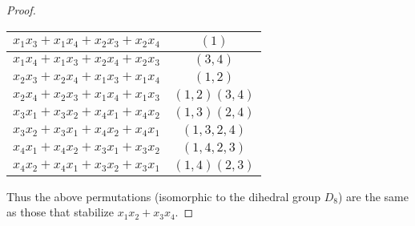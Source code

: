 \documentclass{article}
\begin{document}
\begin{enumerate}[label=(\alph*)]
\begin{proof}
            \begin{center}
              \begin{tabular}{ |c|c| } 
                \hline
                $x_1 x_3 + x_1 x_4 + x_2 x_3 + x_2 x_4$ & $(1)$ \\
                \hline
                $x_1 x_4 + x_1 x_3 + x_2 x_4 + x_2 x_3$ & $(3, 4)$ \\
                \hline
                $x_2 x_3 + x_2 x_4 + x_1 x_3 + x_1 x_4$ & $(1, 2)$ \\
                \hline
                $x_2 x_4 + x_2 x_3 + x_1 x_4 + x_1 x_3$ & $(1, 2)(3, 4)$ \\
                \hline
                $x_3 x_1 + x_3 x_2 + x_4 x_1 + x_4 x_2$ & $(1, 3)(2, 4)$ \\
                \hline
                $x_3 x_2 + x_3 x_1 + x_4 x_2 + x_4 x_1$ & $(1, 3, 2, 4)$ \\
                \hline
                $x_4 x_1 + x_4 x_2 + x_3 x_1 + x_3 x_2$ & $(1, 4, 2, 3)$ \\
                \hline
                $x_4 x_2 + x_4 x_1 + x_3 x_2 + x_3 x_1$ & $(1, 4)(2, 3)$ \\
                \hline
              \end{tabular}
            \end{center}

            Thus the above permutations (isomorphic to the dihedral group $D_8$) are the same as those that stabilize $x_1 x_2 + x_3 x_4$.
          \end{proof}
\end{enumerate}
\end{document}
